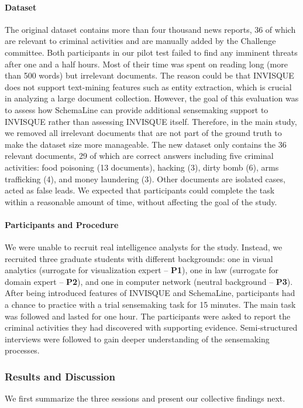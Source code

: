 \paragraph{Dataset}
The original dataset contains more than four thousand news reports, 36 of which are relevant to criminal activities and are manually added by the Challenge committee. Both participants in our pilot test failed to find any imminent threats after one and a half hours. Most of their time was spent on reading long (more than 500 words) but irrelevant documents. The reason could be that INVISQUE does not support text-mining features such as entity extraction, which is crucial in analyzing a large document collection. However, the goal of this evaluation was to assess how SchemaLine can provide additional sensemaking support to INVISQUE rather than assessing INVISQUE itself. Therefore, in the main study, we removed all irrelevant documents that are not part of the ground truth to make the dataset size more manageable. The new dataset only contains the 36 relevant documents, 29 of which are correct answers including five criminal activities: food poisoning (13 documents), hacking (3), dirty bomb (6), arms trafficking (4), and money laundering (3). Other documents are isolated cases, acted as false leads. We expected that participants could complete the task within a reasonable amount of time, without affecting the goal of the study. 

\paragraph{Participants and Procedure}
We were unable to recruit real intelligence analysts for the study. Instead, we recruited three graduate students with different backgrounds:  one in visual analytics (surrogate for visualization expert -- \textbf{P1}), one in law (surrogate for domain expert -- \textbf{P2}), and one in computer network (neutral background -- \textbf{P3}). After being introduced features of INVISQUE and SchemaLine, participants had a chance to practice with a trial sensemaking task for 15 minutes. The main task was followed and lasted for one hour. The participants were asked to report the criminal activities they had discovered with supporting evidence. Semi-structured interviews were followed to gain deeper understanding of the sensemaking processes.

\subsubsection{Results and Discussion}
We first summarize the three sessions and present our collective findings next.

